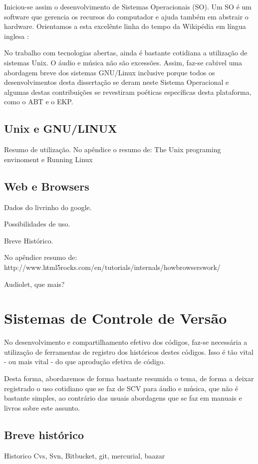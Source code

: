 Iniciou-se assim o desenvolvimento de Sistemas Operacionais (SO).
Um SO é um software que gerencia os recursos do computador e ajuda
também em abstrair o hardware. Orientamos a esta excelênte linha do
tempo da Wikipédia em língua inglesa \cite{solinhadotempo}:

No trabalho com tecnologias abertas, ainda é bastante cotidiana
a utilização de sistemas Unix. O áudio e música não são excessões.
Assim, faz-se cabivel uma abordagem breve dos sistemas GNU/Linux
inclusive porque todos os desenvolvimentos desta dissertação se deram
neste Sistema Operacional e algumas destas contribuições se revestiram
poéticas específicas desta plataforma, como o ABT e o EKP.

\subsection{Unix e GNU/LINUX}
Resumo de utilização. No apêndice o resumo de:
The Unix programing envinoment
e
Running Linux


\subsection{Web e Browsers}

Dados do livrinho do google.

Possibilidades de uso.

Breve Histórico.

No apêndice resumo de:
http://www.html5rocks.com/en/tutorials/internals/howbrowserswork/

Audiolet, que mais?

\section{Sistemas de Controle de Versão}
No desenvolvimento e compartilhamento efetivo dos códigos, faz-se
necessária a utilização de ferramentas de registro dos históricos destes
códigos. Isso é tão vital - ou mais vital - do que aprodução efetiva de código.

Desta forma, abordaremos de forma bastante resumida o tema, de forma a deixar
registrado o uso cotidiano que se faz de SCV para áudio e música, que não
é bastante simples, ao contrário das usuais abordagens que se faz em manuais e livros
sobre este assunto.

\subsection{Breve histórico}
Historico Cvs, Svn, Bitbucket, git, mercurial, baazar

